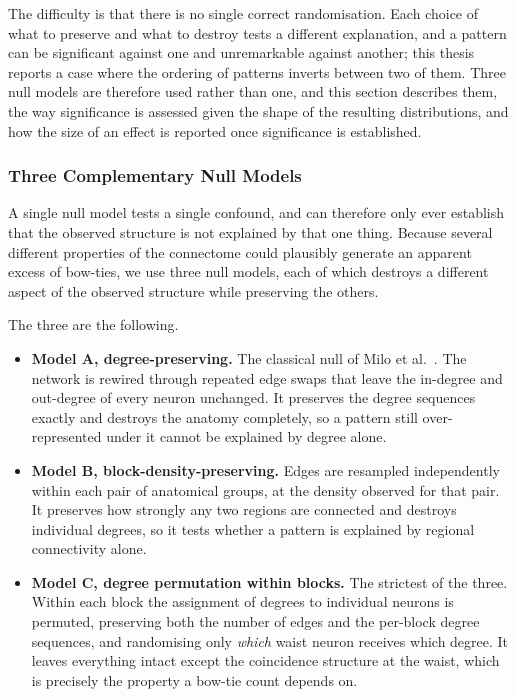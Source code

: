 \documentclass[12pt,a4paper,oneside]{article}
\theoremstyle{definition}
\theoremstyle{plain}
\begin{document}
The difficulty is that there is no single correct randomisation. Each choice
of what to preserve and what to destroy tests a different explanation, and a
pattern can be significant against one and unremarkable against another; this
thesis reports a case where the ordering of patterns inverts between two of
them. Three null models are therefore used rather than one, and this section
describes them, the way significance is assessed given the shape of the
resulting distributions, and how the size of an effect is reported once
significance is established.

\subsubsection{Three Complementary Null Models}

A single null model tests a single confound, and can therefore only ever
establish that the observed structure is not explained by that one thing.
Because several different properties of the connectome could plausibly
generate an apparent excess of bow-ties, we use three null models, each of
which destroys a different aspect of the observed structure while preserving
the others.

The three are the following.

\begin{itemize}
  \item \textbf{Model A, degree-preserving.} The classical null of Milo et
    al.\ \cite{milo2002,maslov2002}. The network is rewired through repeated
    edge swaps that leave the in-degree and out-degree of every neuron
    unchanged. It preserves the degree sequences exactly and destroys the
    anatomy completely, so a pattern still over-represented under it cannot
    be explained by degree alone.

  \item \textbf{Model B, block-density-preserving.} Edges are resampled
    independently within each pair of anatomical groups, at the density
    observed for that pair. It preserves how strongly any two regions are
    connected and destroys individual degrees, so it tests whether a pattern
    is explained by regional connectivity alone.

  \item \textbf{Model C, degree permutation within blocks.} The strictest of
    the three. Within each block the assignment of degrees to individual
    neurons is permuted, preserving both the number of edges and the
    per-block degree sequences, and randomising only \emph{which} waist
    neuron receives which degree. It leaves everything intact except the
    coincidence structure at the waist, which is precisely the property a
    bow-tie count depends on.
\end{itemize}
\end{document}
